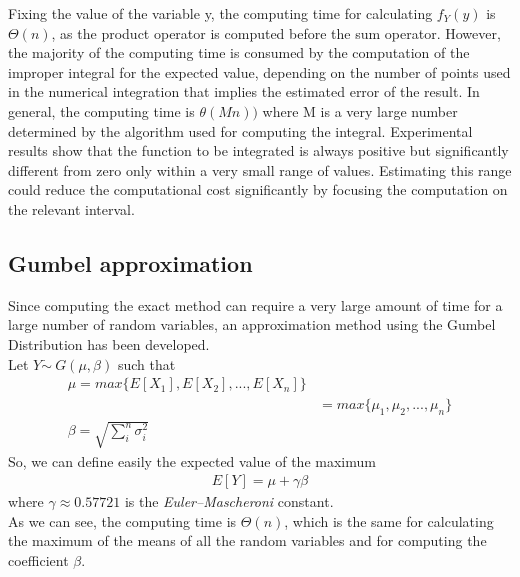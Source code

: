 Fixing the value of the variable y, the computing time for calculating $f_Y(y)$ is $\Theta(n)$, as the product operator is computed before the sum operator. However, the majority of the computing time is consumed by the computation of the improper integral for the expected value, depending on the number of points used in the numerical integration that implies the estimated error of the result. In general, the computing time is $\theta(M n))$ where M is a very large number determined by the algorithm used for computing the integral.
Experimental results show that the function to be integrated is always positive but significantly different from zero only within a very small range of values. Estimating this range could reduce the computational cost significantly by focusing the computation on the relevant interval.

\subsection{Gumbel approximation}
Since computing the exact method can require a very large amount of time for a large number of random variables, an approximation method using the Gumbel Distribution has been developed. \\
Let $Y \dot \sim \ G(\mu, \beta)$ such that
\begin{align*}
	\mu = max\{E[X_1], E[X_2], ..., E[X_n]\} \\
	&= max\{\mu_1, \mu_2, ..., \mu_n\} \tag*{(since $X_i \sim N(\mu_i, \sigma_i^2)$)} \\
	\beta = \sqrt{\sum_{i}^n{\sigma_i^2}}
\end{align*}
So, we can define easily the expected value of the maximum
\begin{align*}
	E[Y] = \mu + \gamma \beta
\end{align*}
where $\gamma \approx 0.57721$ is the \textit{Euler–Mascheroni} constant. \\
As we can see, the computing time is $\Theta(n)$, which is the same for calculating the maximum of the means of all the random variables and for computing the coefficient $\beta$.